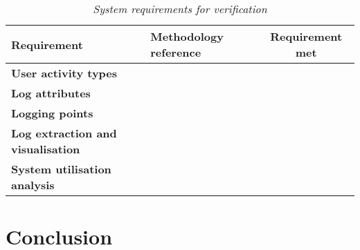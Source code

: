 \begin{table}[!htb]
	\centering
	\caption[System requirements for verification]
	{\textit{System requirements for verification}}
	\label{tbl:ch2_verification}
	\begin{tabularx}{\textwidth}{|X|l|c|}
		\hline \textbf{Requirement} & \textbf{Methodology reference} & \textbf{Requirement met} \\
		\hline \textbf{User activity types} & \Cref{sec:ch2_requirementsOfUAT,sec:ch2_userActivityTypes} & \Checkmark \\
		\hline \textbf{Log attributes} & \Cref{sec:ch2_logAttributes} & \Checkmark \\
		\hline \textbf{Logging points} & \Cref{sec:ch2_loggingPoints,sec:ch2_webApplicationArchitecture,sec:ch2_ElementObtaining} & \Checkmark \\
		\hline \textbf{Log extraction and visualisation} & \Cref{sec:ch2_logExtraction} & \Checkmark \\
		\hline \textbf{System utilisation analysis} & \Cref{sec:ch2_utilisationImprovements} & \Checkmark \\
		\hline
	\end{tabularx}
\end{table}

\section{Conclusion}